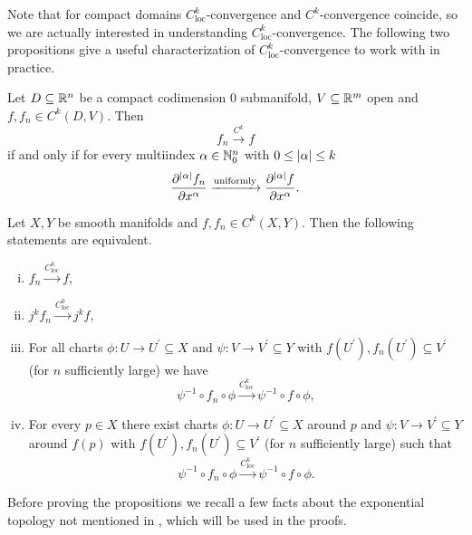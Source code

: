 Note that for compact domains $C^k_{\mathrm{loc}}$-convergence and $C^k$-convergence coincide, so we are actually interested in understanding $C^k_{\mathrm{loc}}$-convergence. The following two propositions give a useful characterization of $C^k_{\mathrm{loc}}$-convergence to work with in practice. 

\begin{proposition}
    \label{whitney_top:prop:ck_conv_on_rn}
    Let $D\subseteq \mathbb{R}^n$ be a compact codimension $0$ submanifold, $V \subseteq \mathbb{R}^m$ open and $f,f_n \in C^k(D,V)$. Then
    \[
    f_n \xrightarrow{C^k} f
    \]
    if and only if for every multiindex $\alpha \in \mathbb{N}^n_0$ with $0\leq\lvert\alpha\rvert \leq k$
    \[
    \frac{\partial^{\lvert\alpha\rvert}f_n}{\partial x^\alpha} \xrightarrow{\mathrm{uniformly}}\frac{\partial^{\lvert\alpha\rvert}f}{\partial x^\alpha}.
    \]
\end{proposition}

\begin{proposition}
    \label{whitney_top:prop:ck_conv_equivalent_characterizations}
    Let $X,Y$ be smooth manifolds and $f,f_n \in C^k(X,Y)$. Then the following statements are equivalent.
    \begin{enumerate}[(i)]
        \item $f_n \xrightarrow{C^k_{\mathrm{loc}}} f$,
        \item $j^kf_n \xrightarrow{C^0_{\mathrm{loc}}} j^kf$,
        \item For all charts $\phi \colon U \to U^\prime \subseteq X$ and $\psi \colon V \to V^\prime \subseteq Y$ with $f(U^\prime), f_n(U^\prime) \subseteq V^\prime$ (for $n$ sufficiently large) we have 
        \[
        \psi^{-1} \circ f_n \circ \phi \xrightarrow{C^k_{\mathrm{loc}}} \psi^{-1} \circ f \circ \phi,
        \]
        \item For every $p \in X$ there exist charts $\phi \colon U \to U^\prime \subseteq X$ around $p$ and $\psi \colon V \to V^\prime \subseteq Y$ around $f(p)$ with $f(U^\prime), f_n(U^\prime) \subseteq V^\prime$ (for $n$ sufficiently large) such that
        \[
        \psi^{-1} \circ f_n \circ \phi \xrightarrow{C^k_{\mathrm{loc}}} \psi^{-1} \circ f \circ \phi.
        \]
    \end{enumerate}
\end{proposition}

Before proving the propositions we recall a few facts about the exponential topology not mentioned in \cite{steimle_topo}, which will be used in the proofs.

